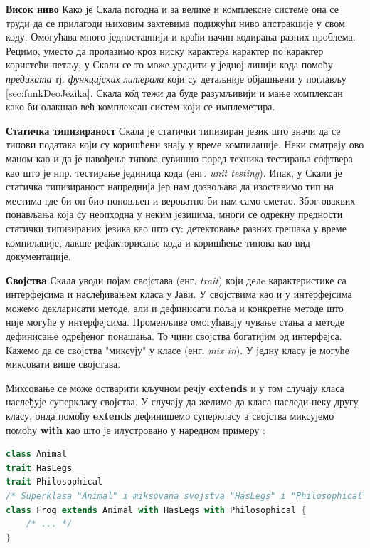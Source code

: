 \documentclass[12pt,oneside]{memoir}
\begin{document}
\begin{description}
\item \textbf{Висок ниво} Како је Скала погодна и за велике и комплексне системе она се труди да се прилагоди њиховим захтевима подижући ниво апстракције у свом коду. Омогућава много једноставнији и краћи начин кодирања разних проблема. Рецимо, уместо да пролазимо кроз ниску карактера карактер по карактер користећи петљу, у Скали се то може урадити у једној линији кода помоћу \textit{предиката} тј.  \textit{функцијских литерала} који су детаљније објашњени у поглављу \ref{sec:funkDeoJezika}. Скала к\^{о}д тежи да буде разумљивији и мање комплексан како би олакшао већ комплексан систем који се имплеметира.

\item \textbf{Статичка типизираност} Скала је статички типизиран језик што значи да се типови података који су коришћени знају у време компилације. Неки сматрају ово маном као и да је навођење типова сувишно поред техника тестирања софтвера као што је нпр. тестирање јединица кода (енг. \textit{unit testing}). Ипак, у Скали је статичка типизираност напреднија јер нам дозвољава да изоставимо тип на местима где би он био поновљен и вероватно би нам само сметао. Због оваквих понављања која су неопходна у неким језицима, многи се одрекну предности статички типизираних језика као што су: детектовање разних грешака у време компилације, лакше рефакторисање кода и коришћење типова као вид документације.

\item \textbf{Својствa} Скала уводи појам својстава (енг. \textit{trait}) који делe карактеристике са интерфејсима и наслеђивањем класа у Јави. У својствима као и у интерфејсима можемо декларисати методе, али и дефинисати поља и конкретне методе што није могуће у интерфејсима. Променљиве омогућавају чување стања а методе дефинисање одређеног понашања. То чини својства богатијим од интерфејса.  Кажемо да се својства "миксују" у класе (енг. \textit{mix in}). У једну класу је могуће миксовати више својстава.

Миксовање се може остварити кључном речју \textbf{extends} и у том случају класа наслеђује суперкласу својства. У случају да желимо да класа наследи неку другу класу, онда помоћу \textbf{extends} дефинишемо суперкласу а својства миксујемо помоћу \textbf{with} као што је илустровано у наредном примеру \cite{progInScala}: 

\begin{lstlisting}[language=Scala]
class Animal
trait HasLegs
trait Philosophical
/* Superklasa "Animal" i miksovana svojstva "HasLegs" i "Philosophical" */
class Frog extends Animal with HasLegs with Philosophical {
	/* ... */
}
\end{lstlisting}


\end{description}
\end{document}
